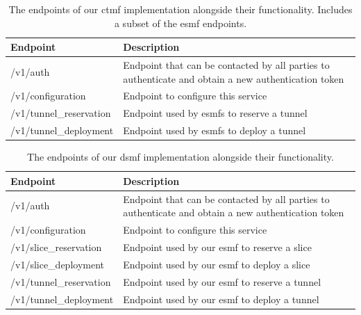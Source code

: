 \begin{table}[htp]
    \begin{tabularx}{\textwidth}{ |l|X| }
        \hline
        \textbf{Endpoint} & \textbf{Description} \\
        \hline
         /v1/auth & Endpoint that can be contacted by all parties to authenticate and obtain a new authentication token \\
         /v1/configuration & Endpoint to configure this service \\
        \hline
         /v1/tunnel\_reservation & Endpoint used by \acrshort{esmf}s to reserve a tunnel  \\
         /v1/tunnel\_deployment & Endpoint used by \acrshort{esmf}s to deploy a tunnel \\
        \hline
    \end{tabularx}
    \caption[\acrshort{ctmf} endpoints]{The endpoints of our \acrshort{ctmf} implementation alongside their functionality. Includes a subset of the \acrshort{esmf} endpoints.}
    \label{table:ctmf}
\end{table}

\begin{table}[htp]
    \begin{tabularx}{\textwidth}{ |l|X| }
        \hline
        \textbf{Endpoint} & \textbf{Description} \\
        \hline
         /v1/auth & Endpoint that can be contacted by all parties to authenticate and obtain a new authentication token \\
         /v1/configuration & Endpoint to configure this service \\
        \hline
         /v1/slice\_reservation & Endpoint used by our \acrshort{esmf} to reserve a slice \\
         /v1/slice\_deployment & Endpoint used by our \acrshort{esmf} to deploy a slice \\
         /v1/tunnel\_reservation & Endpoint used by our \acrshort{esmf} to reserve a tunnel  \\
         /v1/tunnel\_deployment & Endpoint used by our \acrshort{esmf} to deploy a tunnel \\
        \hline
    \end{tabularx}
    \caption[\acrshort{dsmf} endpoints]{The endpoints of our \acrshort{dsmf} implementation alongside their functionality.}
    \label{table:dsmf}
\end{table}

